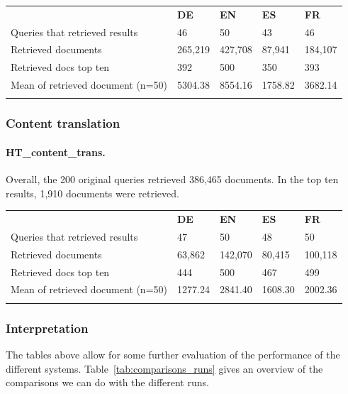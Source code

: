 \documentclass[a4paper,11pt]{article}
\begin{document}
\begin{table}[h]
\centering
\begin{tabularx}{0.81\textwidth}{lllll}
\cmidrule{1-5}
\addlinespace
& \textbf{DE} & \textbf{EN} & \textbf{ES} & \textbf{FR} \\
\addlinespace
\cmidrule{1-5}
\addlinespace
Queries that retrieved results & 46 & 50 & 43 & 46 \\
Retrieved documents & 265,219 & 427,708 & 87,941 & 184,107 \\
Retrieved docs top ten & 392 & 500 & 350 & 393 \\
Mean of retrieved document (n=50) & 5304.38 & 8554.16 & 1758.82 & 3682.14 \\
\addlinespace
\cmidrule{1-5}
\end{tabularx}
\label{result_list_analysis_8004}
\end{table}

\newpage

\subsubsection{Content translation}
\paragraph{HT\_content\_trans.}
Overall, the 200 original queries retrieved 386,465 documents. In the top ten results, 1,910 documents were retrieved.

\begin{table}[!h]
\centering
\begin{tabularx}{0.81\textwidth}{lllll}
\cmidrule{1-5}
\addlinespace
& \textbf{DE} & \textbf{EN} & \textbf{ES} & \textbf{FR} \\
\addlinespace
\cmidrule{1-5}
\addlinespace
Queries that retrieved results & 47 & 50 & 48 & 50 \\
Retrieved documents & 63,862 & 142,070 & 80,415 & 100,118 \\
Retrieved docs top ten & 444 & 500 & 467 & 499 \\
Mean of retrieved document (n=50) & 1277.24 & 2841.40 & 1608.30 & 2002.36 \\
\addlinespace
\cmidrule{1-5}
\end{tabularx}
\label{result_list_analysis_8003}
\end{table}


\subsubsection{Interpretation}
The tables above allow for some further evaluation of the performance of the different systems. Table~\ref{tab:comparisons_runs} gives an overview of the comparisons we can do with the different runs.
\end{document}
